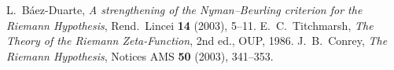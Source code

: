 \documentclass[11pt]{article}
\theoremstyle{remark}
\begin{document}
\begin{thebibliography}{9}
 L.~B\'aez-Duarte, \emph{A strengthening of the Nyman--Beurling criterion for the Riemann Hypothesis}, Rend.~Lincei \textbf{14} (2003), 5--11.
 E.~C.~Titchmarsh, \emph{The Theory of the Riemann Zeta-Function}, 2nd ed., OUP, 1986.
 J.~B.~Conrey, \emph{The Riemann Hypothesis}, Notices AMS \textbf{50} (2003), 341--353.
\end{thebibliography}
\end{document}
